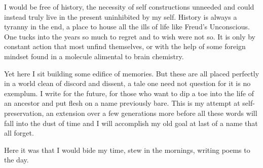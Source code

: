 \documentclass[ebook, 10pt, openright, onecolumn]{memoir}
\begin{document}
I would be free of history, the necessity of self constructions unneeded and
could instead truly live in the present uninhibited by my self.  History is
always a tyranny in the end, a place to house all the ills of life like Freud's
Unconscious.  One tucks into the years so much to regret and to wish were not
so.  It is only by constant action that most unfind themselves, or with the help
of some foreign mindset found in a molecule alimental to brain chemistry.

Yet here I sit building some edifice of memories.  But these are all placed
perfectly in a world clean of discord and dissent, a tale one need not question
for it is no exemplum.  I write for the future, for those who want to dip a toe
into the life of an ancestor and put flesh on a name previously bare.  This is
my attempt at self-preservation, an extension over a few generations more before
all these words will fall into the dust of time and I will accomplish my old
goal at last of a name that all forget.

Here it was that I would bide my time, stew in the mornings, writing poems to the
day.
\end{document}
